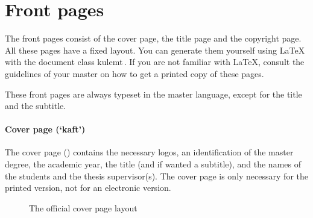 \documentclass[11pt,article,oneside,a4paper]{memoir}
\newcommand\Dutch[1]{`\foreignlanguage{dutch}{#1}'}
\newcommand*\cls[1]{\textsf{#1}}
\begin{document}
\section{Front pages}
The front pages consist of the cover page, the title page and the copyright
page. All these pages have a fixed layout. You can generate them yourself
using LaTeX with the document class \cls{kulemt}\,\cite{pkg:kulemt}. If you
are not familiar with LaTeX, consult the guidelines of your master on how
to get a printed copy of these pages.

These front pages are always typeset in the master language, except for the
title and the subtitle.

\paragraph{Cover page (\Dutch{kaft})} The cover page ()
contains the necessary logos, an identification of the master degree, the
academic year, the title (and if wanted a subtitle), and the names of the
students and the thesis supervisor(s). The cover page is only necessary for
the printed version, not for an electronic version.
\begin{figure}
  \centering \fboxsep=0pt
  \caption{The official cover page layout}
  \label{fig:coverpage}
\end{figure}
\end{document}
